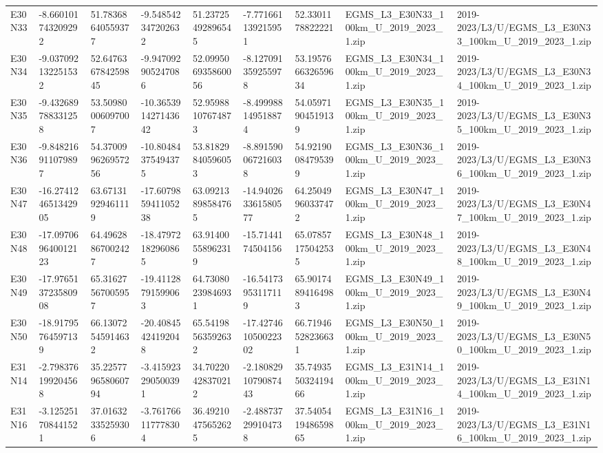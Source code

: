 \begin{landscape}
\begin{longtable}{lllllllll}
E30N33 & -8.660101743209292 & 51.78368640559377 & -9.548542347202632 & 51.23725492896545 & -7.771661139215951 & 52.3301178822221 & EGMS\_L3\_E30N33\_100km\_U\_2019\_2023\_1.zip & 2019-2023/L3/U/EGMS\_L3\_E30N33\_100km\_U\_2019\_2023\_1.zip \\
E30N34 & -9.037092132251532 & 52.647636784259845 & -9.947092905247086 & 52.099506935860056 & -8.127091359255978 & 53.195766632659634 & EGMS\_L3\_E30N34\_100km\_U\_2019\_2023\_1.zip & 2019-2023/L3/U/EGMS\_L3\_E30N34\_100km\_U\_2019\_2023\_1.zip \\
E30N35 & -9.432689788331258 & 53.50980006097007 & -10.365391427143642 & 52.95988107674873 & -8.499988149518874 & 54.05971904519139 & EGMS\_L3\_E30N35\_100km\_U\_2019\_2023\_1.zip & 2019-2023/L3/U/EGMS\_L3\_E30N35\_100km\_U\_2019\_2023\_1.zip \\
E30N36 & -9.848216911079897 & 54.370099626957256 & -10.80484375494375 & 53.81829840596053 & -8.891590067216038 & 54.92190084795399 & EGMS\_L3\_E30N36\_100km\_U\_2019\_2023\_1.zip & 2019-2023/L3/U/EGMS\_L3\_E30N36\_100km\_U\_2019\_2023\_1.zip \\
E30N47 & -16.274124651342905 & 63.67131929461119 & -17.607985941105238 & 63.09213898584765 & -14.940263361580577 & 64.25049960337472 & EGMS\_L3\_E30N47\_100km\_U\_2019\_2023\_1.zip & 2019-2023/L3/U/EGMS\_L3\_E30N47\_100km\_U\_2019\_2023\_1.zip \\
E30N48 & -17.097069640012123 & 64.49628867002427 & -18.47972182960865 & 63.91400558962319 & -15.7144174504156 & 65.07857175042535 & EGMS\_L3\_E30N48\_100km\_U\_2019\_2023\_1.zip & 2019-2023/L3/U/EGMS\_L3\_E30N48\_100km\_U\_2019\_2023\_1.zip \\
E30N49 & -17.976513723580908 & 65.31627567005957 & -19.41128791599063 & 64.73080239846931 & -16.54173953117119 & 65.90174894164983 & EGMS\_L3\_E30N49\_100km\_U\_2019\_2023\_1.zip & 2019-2023/L3/U/EGMS\_L3\_E30N49\_100km\_U\_2019\_2023\_1.zip \\
E30N50 & -18.91795764597139 & 66.13072545914632 & -20.40845424192048 & 65.54198563592632 & -17.427461050022302 & 66.71946528236631 & EGMS\_L3\_E30N50\_100km\_U\_2019\_2023\_1.zip & 2019-2023/L3/U/EGMS\_L3\_E30N50\_100km\_U\_2019\_2023\_1.zip \\
E31N14 & -2.798376199204568 & 35.225779658060794 & -3.415923290500391 & 34.70220428370212 & -2.1808291079087443 & 35.749355032419466 & EGMS\_L3\_E31N14\_100km\_U\_2019\_2023\_1.zip & 2019-2023/L3/U/EGMS\_L3\_E31N14\_100km\_U\_2019\_2023\_1.zip \\
E31N16 & -3.125251708441521 & 37.01632335259306 & -3.761766117778304 & 36.49210475652625 & -2.488737299104738 & 37.540541948659865 & EGMS\_L3\_E31N16\_100km\_U\_2019\_2023\_1.zip & 2019-2023/L3/U/EGMS\_L3\_E31N16\_100km\_U\_2019\_2023\_1.zip \\

\end{longtable}
\end{landscape}
